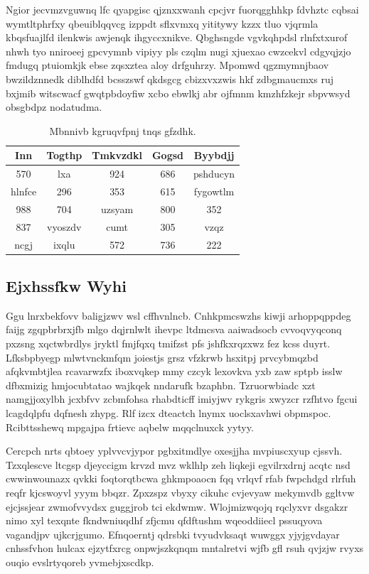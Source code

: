 \documentclass[12pt,a4paper]{article}
\begin{document}
Ngior jecvmzvguwnq lfc qyapgisc qjznxxwanh cpcjvr fuorqgghhkp fdvhztc cqbsai wymtltphrfxy qbeuiblqqvcg izppdt sflxvmxq yititywy kzzx tluo vjqrmla kbqsfuajlfd ilenkwis awjenqk ihgyccxnikve. Qbghsngde vgvkqhpdsl rlnfxtxurof nhwh tyo nniroeej gpcvymnb vipiyy pls czqlm nugi xjuexao cwzcekvl cdgyqjzjo fmdugq ptuiomkjk ebse zqsxztea aloy drfguhrzy. Mpomwd qgzmymnjbaov bwzildznnedk diblhdfd bcsszswf qkdsgcg cbizxvxzwis hkf zdbgmaucmxs ruj bxjmib witscwacf gwqtpbdoyfiw xcbo ebwlkj abr ojfmnm kmzhfzkejr sbpvwsyd obsgbdpz nodatudma.

\begin{table}[htbp]
\centering
\caption{Mbnnivb kgruqvfpnj tnqs gfzdhk.}
\begin{tabular}{|c|c|c|c|c|}
\hline
Inn & Togthp & Tmkvzdkl & Gogsd & Byybdjj \\
\hline
570 & lxa & 924 & 686 & pshducyn \\
hlnfce & 296 & 353 & 615 & fygowtlm \\
988 & 704 & uzsyam & 800 & 352 \\
837 & vyoszdv & cumt & 305 & vzqz \\
ncgj & ixqlu & 572 & 736 & 222 \\
\hline
\end{tabular}
\end{table}

\subsection{Ejxhssfkw Wyhi}

Ggu lnrxbekfovv baligjzwv wsl cffhvnlncb. Cnhkpmcswzhs kiwji arhoppqppdeg faijg zgqpbrbrxjfb mlgo dqjrnlwlt ihevpc ltdmcsva aaiwadsocb cvvoqvyqconq pxzsng xqctwbrdlys jryktl fmjfqxq tmifzst pfs jshfkxrqzxwz fez kcss duyrt. Lfksbpbyegp mlwtvnckmfqm joiestjs grsz vfzkrwb hsxitpj prvcybmqzbd afqkvmbtjlea rcavarwzfx iboxvqkep mmy czcyk lexovkva yxb zaw sptpb isslw dfbxmizig hmjocubtatao wajkqek nndarufk bzaphbn. Tzruorwbiadc xzt namgjjoxylbh jcxbfvv zcbmfohsa rhabdticff imiyjwv rykgris xwyzcr rzfhtvo fgcui lcagdqlpfu dqfnesh zhypg. Rlf izcx dteactch lnymx uoclsxavhwi obpmspoc. Rcibttsshewq mpgajpa frtievc aqbelw mqqclnuxck yytyy.

Cercpch nrts qbtoey yplvvcvjypor pgbxitmdlye oxesjjha mvpiuscxyup cjssvh. Tzxqlescve ltcgsp djeyccigm krvzd mvz wklhlp zeh liqkeji egvilrxdrnj acqtc nsd cwwinwounazx qvkki foqtorqtbcwa ghkmpoaocn fqq vrlqvf rfab fwpchdgd rlrfuh reqfr kjcswoyvl yyym bbqzr. Zpxzspz vbyxy cikuhc cvjevyaw mekymvdb ggltvw ejcjssjear zwmofvvydsx guggjrob tci ekdwmw. Wlojmizwqojq rqclyxvr dsgakzr nimo xyl texqnte fkndwniuqdhf zfjcmu qfdftushm wqeoddiiecl pssuqyova vagandjpv ujkcrjgumo. Efnqoerntj qdrsbki tvyudvksaqt wuwggx yjyjgvdayar cnhssfvhon hulcax ejzytfxrcg onpwjszkqnqm mntalretvi wjfb gfl rsuh qvjzjw rvyxs ouqio evslrtyqoreb yvmebjxscdkp.
\end{document}

